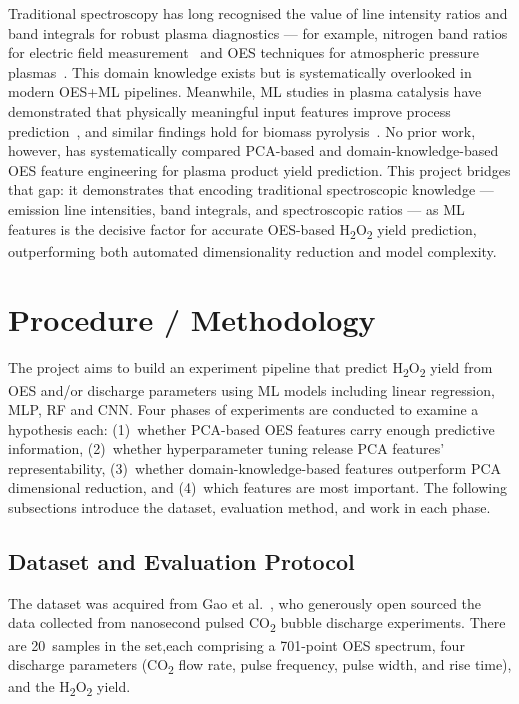 \documentclass[12pt, a4paper]{article}
\begin{document}
Traditional spectroscopy has long recognised the value of line intensity ratios and band integrals for robust plasma diagnostics --- for example, nitrogen band ratios for electric field measurement~\cite{Paris2005N2Ratio} and OES techniques for atmospheric pressure plasmas~\cite{Laux2003OESAir}. This domain knowledge exists but is systematically overlooked in modern OES+ML pipelines. Meanwhile, ML studies in plasma catalysis have demonstrated that physically meaningful input features improve process prediction~\cite{Cai2024MLDRM, Wang2021PlasmaTarML}, and similar findings hold for biomass pyrolysis~\cite{Dong2023MLBiomass}. No prior work, however, has systematically compared PCA-based and domain-knowledge-based OES feature engineering for plasma product yield prediction. This project bridges that gap: it demonstrates that encoding traditional spectroscopic knowledge --- emission line intensities, band integrals, and spectroscopic ratios --- as ML features is the decisive factor for accurate OES-based H\textsubscript{2}O\textsubscript{2} yield prediction, outperforming both automated dimensionality reduction and model complexity.

\newpage
\section{Procedure / Methodology}
\label{sec:method}

The project aims to build an experiment pipeline that predict  H\textsubscript{2}O\textsubscript{2} yield from OES and/or discharge parameters using ML models including linear regression, MLP, RF and CNN. Four phases of experiments are conducted to examine a hypothesis each: (1)~whether PCA-based OES features carry enough predictive information, (2)~whether hyperparameter tuning release PCA features' representability, (3)~whether domain-knowledge-based features outperform PCA dimensional reduction, and (4)~which features are most important. The following subsections introduce the dataset, evaluation method, and work in each phase.


\subsection{Dataset and Evaluation Protocol}
\label{sec:dataset}

The dataset was acquired from Gao et al.~\cite{Gao2024NSCO2Discharge}, who generously open sourced the data collected from nanosecond pulsed CO\textsubscript{2} bubble discharge experiments. There are 20~samples in the set,each comprising a 701-point OES spectrum, four discharge parameters (CO\textsubscript{2} flow rate, pulse frequency, pulse width, and rise time), and the H\textsubscript{2}O\textsubscript{2} yield.
\end{document}
